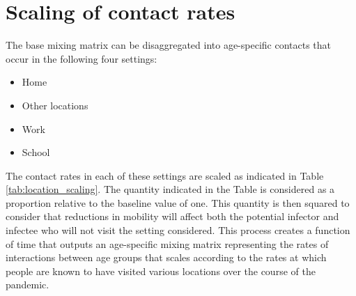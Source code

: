 \section{Scaling of contact rates}
The base mixing matrix can be disaggregated into age-specific contacts that occur 
in the following four settings:
\begin{itemize}
    \item Home
    \item Other locations
    \item Work
    \item School
\end{itemize}
The contact rates in each of these settings are scaled as indicated in 
Table \ref{tab:location_scaling}.
The quantity indicated in the Table is considered as a proportion relative to
the baseline value of one.
This quantity is then squared to consider that reductions in mobility will affect
both the potential infector and infectee who will not visit the setting considered.
This process creates a function of time that outputs an age-specific
mixing matrix representing the rates of interactions between age groups
that scales according to the rates at which people
are known to have visited various locations over the course of the pandemic.